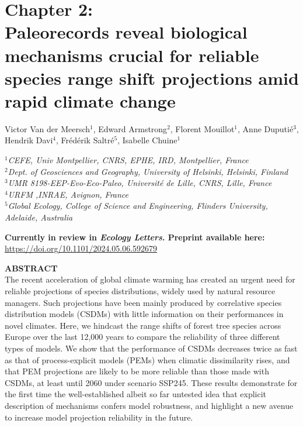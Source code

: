 
\section{Chapter 2:\\ Paleorecords reveal biological mechanisms crucial for reliable species range shift projections amid rapid climate change}
\label{chapter2}

\vspace*{1cm}
\sffamily
\large
\begin{center}
Victor Van der Meersch$^1$, Edward Armstrong$^2$, Florent Mouillot$^1$, Anne Duputié$^3$, Hendrik Davi$^4$, Frédérik Saltré$^5$, Isabelle Chuine$^1$

\vspace*{0.1cm}
\small
\emph{$^1$CEFE, Univ Montpellier, CNRS, EPHE, IRD, Montpellier, France\\}
\emph{$^2$Dept. of Geosciences and Geography, University of Helsinki, Helsinki, Finland\\}
\emph{$^3$UMR 8198-EEP-Evo-Eco-Paleo, Université de Lille, CNRS, Lille, France\\}
\emph{$^4$URFM ,INRAE, Avignon, France\\}
\emph{$^5$Global Ecology, College of Science and Engineering, Flinders University, Adelaide, Australia}
\end{center}

\vspace*{0.7cm}
\normalsize
\textbf{Currently in review in \emph{Ecology Letters}. Preprint available here:\\} \url{https://doi.org/10.1101/2024.05.06.592679}

\vspace*{1cm}

\textbf{ABSTRACT}\\
The recent acceleration of global climate warming has created an urgent need for reliable projections of species distributions, widely used by natural resource managers. Such projections have been mainly produced by correlative species distribution models (CSDMs) with little information on their performances in novel climates. Here, we hindcast the range shifts of forest tree species across Europe over the last 12,000 years to compare the reliability of three different types of models. We show that the performance of CSDMs decreases twice as fast as that of process-explicit models (PEMs) when climatic dissimilarity rises, and that PEM projections are likely to be more reliable than those made with CSDMs, at least until 2060 under scenario SSP245. These results demonstrate for the first time the well-established albeit so far untested idea that explicit description of mechanisms confers model robustness, and highlight a new avenue to increase model projection reliability in the future.

